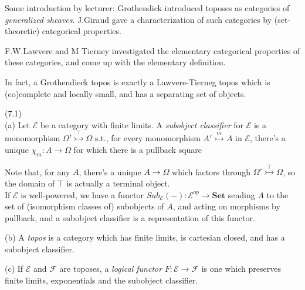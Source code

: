 \documentclass[a4paper]{article}
\begin{document}
Some introduction by lecturer: Grothendick introduced toposes as categories of \emph{generalized sheaves}. J.Giraud gave a characterization of such categories by (set-theoretic) categorical properties.

F.W.Lawvere and M Tierney investigated the elementary categorical properties of these categories, and come up with the elementary definition.

In fact, a Grothendieck topos is exactly a Lawvere-Tierneg topos which is (co)complete and locally small, and has a separating set of objects.

\begin{defi} (7.1)\\
    (a) Let $\mathcal{E}$ be a category with finite limits. A \emph{subobject classifier} for $\mathcal{E}$ is a monomorphism $\Omega' \stackrel{\top}{\rightarrowtail} \Omega$ s.t., for every monomorphism $A' \stackrel{m}{\rightarrowtail} A$ in $\mathcal{E}$, there's a unique $\chi_m:A \to \Omega$ for which there is a pullback square


    Note that, for any $A$, there's a unique $A\to \Omega$ which factors through $\Omega' \stackrel{\top}{\rightarrowtail} \Omega$, so the domain of $\top$ is actually a terminal object.\\
    If $\mathcal{E}$ is well-powered, we have a functor $Sub_\mathcal{E} (-):\mathcal{E}^{op} \to \mathbf{Set}$ sending $A$ to the set of (isomorphism classes of) subobjects of $A$, and acting on morphisms by pullback, and a subobject classifier is a representation of this functor.

    (b) A \emph{topos} is a category which has finite limits, is cartesian closed, and has a subobject classifier.

    (c) If $\mathcal{E}$ and $\mathcal{F}$ are toposes, a \emph{logical functor} $F:\mathcal{E} \to \mathcal{F}$ is one which preserves finite limits, exponentials and the subobject classifier.
\end{defi}
\end{document}
